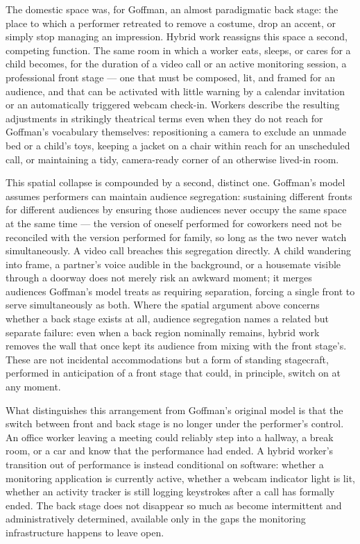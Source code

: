 \documentclass[10pt]{article}
\begin{document}
The domestic space was, for Goffman, an almost paradigmatic back stage: the place to which a performer retreated to remove a costume, drop an accent, or simply stop managing an impression. Hybrid work reassigns this space a second, competing function. The same room in which a worker eats, sleeps, or cares for a child becomes, for the duration of a video call or an active monitoring session, a professional front stage --- one that must be composed, lit, and framed for an audience, and that can be activated with little warning by a calendar invitation or an automatically triggered webcam check-in. Workers describe the resulting adjustments in strikingly theatrical terms even when they do not reach for Goffman's vocabulary themselves: repositioning a camera to exclude an unmade bed or a child's toys, keeping a jacket on a chair within reach for an unscheduled call, or maintaining a tidy, camera-ready corner of an otherwise lived-in room.

This spatial collapse is compounded by a second, distinct one. Goffman's model assumes performers can maintain audience segregation: sustaining different fronts for different audiences by ensuring those audiences never occupy the same space at the same time --- the version of oneself performed for coworkers need not be reconciled with the version performed for family, so long as the two never watch simultaneously. A video call breaches this segregation directly. A child wandering into frame, a partner's voice audible in the background, or a housemate visible through a doorway does not merely risk an awkward moment; it merges audiences Goffman's model treats as requiring separation, forcing a single front to serve simultaneously as both. Where the spatial argument above concerns whether a back stage exists at all, audience segregation names a related but separate failure: even when a back region nominally remains, hybrid work removes the wall that once kept its audience from mixing with the front stage's. These are not incidental accommodations but a form of standing stagecraft, performed in anticipation of a front stage that could, in principle, switch on at any moment.

What distinguishes this arrangement from Goffman's original model is that the switch between front and back stage is no longer under the performer's control. An office worker leaving a meeting could reliably step into a hallway, a break room, or a car and know that the performance had ended. A hybrid worker's transition out of performance is instead conditional on software: whether a monitoring application is currently active, whether a webcam indicator light is lit, whether an activity tracker is still logging keystrokes after a call has formally ended. The back stage does not disappear so much as become intermittent and administratively determined, available only in the gaps the monitoring infrastructure happens to leave open.
\end{document}
